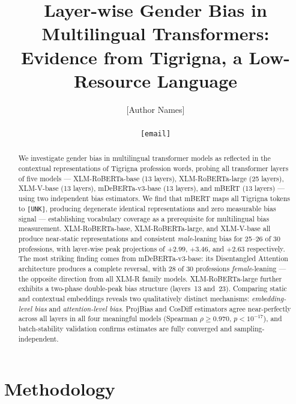 \documentclass[11pt,a4paper]{article}
\begin{document}

\title{\textbf{Layer-wise Gender Bias in Multilingual Transformers:\\
       Evidence from Tigrigna, a Low-Resource Language}}

\author{[Author Names] \\ [Institution] \\ \texttt{[email]}}
\date{}
\maketitle

\begin{abstract}
We investigate gender bias in multilingual transformer models as reflected in
the contextual representations of Tigrigna profession words, probing all
transformer layers of five models — XLM-RoBERTa-base (13 layers),
XLM-RoBERTa-large (25 layers), XLM-V-base (13 layers),
mDeBERTa-v3-base (13 layers), and mBERT (13 layers) — using two independent
bias estimators. We find that mBERT maps all Tigrigna tokens to \texttt{[UNK]},
producing degenerate identical representations and zero measurable bias signal —
establishing vocabulary coverage as a prerequisite for multilingual bias
measurement. XLM-RoBERTa-base, XLM-RoBERTa-large, and XLM-V-base all produce
near-static representations and consistent \emph{male}-leaning bias for 25--26
of 30 professions, with layer-wise peak projections of $+2.99$, $+3.46$, and
$+2.63$ respectively. The most striking finding comes from mDeBERTa-v3-base:
its Disentangled Attention architecture produces a complete reversal, with
28 of 30 professions \emph{female}-leaning — the opposite direction from all
XLM-R family models. XLM-RoBERTa-large further exhibits a two-phase double-peak
bias structure (layers~13 and~23). Comparing static and contextual embeddings
reveals two qualitatively distinct mechanisms: \emph{embedding-level bias} and
\emph{attention-level bias}. ProjBias and CosDiff estimators agree near-perfectly
across all layers in all four meaningful models (Spearman $\rho \geq 0.970$,
$p < 10^{-17}$), and batch-stability validation confirms estimates are fully
converged and sampling-independent.
\end{abstract}

\section{Methodology}
\end{document}
